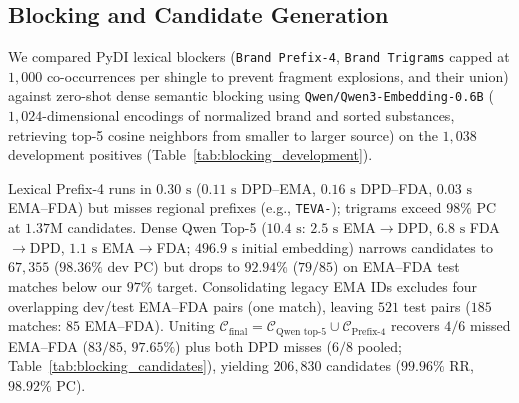 \documentclass{llncs}
\begin{document}
\subsection{Blocking and Candidate Generation}

We compared PyDI lexical blockers (\texttt{Brand Prefix-4}, \texttt{Brand Trigrams} capped at $1{,}000$ co-occurrences per shingle to prevent fragment explosions, and their union) against zero-shot dense semantic blocking using \texttt{Qwen/Qwen3-Embedding-0.6B} ($1{,}024$-dimensional encodings of normalized brand and sorted substances, retrieving top-5 cosine neighbors from smaller to larger source) on the $1{,}038$ development positives (Table~\ref{tab:blocking_development}).

Lexical Prefix-4 runs in $0.30\text{ s}$ ($0.11\text{ s}$ DPD--EMA, $0.16\text{ s}$ DPD--FDA, $0.03\text{ s}$ EMA--FDA) but misses regional prefixes (e.g., \texttt{TEVA-}); trigrams exceed $98\%$ PC at $1.37\text{M}$ candidates. Dense Qwen Top-5 ($10.4\text{ s}$: $2.5\text{ s}$ EMA$\rightarrow$DPD, $6.8\text{ s}$ FDA$\rightarrow$DPD, $1.1\text{ s}$ EMA$\rightarrow$FDA; $496.9\text{ s}$ initial embedding) narrows candidates to $67{,}355$ ($98.36\%$ dev PC) but drops to $92.94\%$ ($79/85$) on EMA--FDA test matches below our $97\%$ target. Consolidating legacy EMA IDs excludes four overlapping dev/test EMA--FDA pairs (one match), leaving $521$ test pairs ($185$ matches: $85$ EMA--FDA). Uniting $\mathcal{C}_{\text{final}} = \mathcal{C}_{\text{Qwen top-5}} \cup \mathcal{C}_{\text{Prefix-4}}$ recovers $4/6$ missed EMA--FDA ($83/85$, $97.65\%$) plus both DPD misses ($6/8$ pooled; Table~\ref{tab:blocking_candidates}), yielding $206{,}830$ candidates ($99.96\%$ RR, $98.92\%$ PC).
\end{document}
